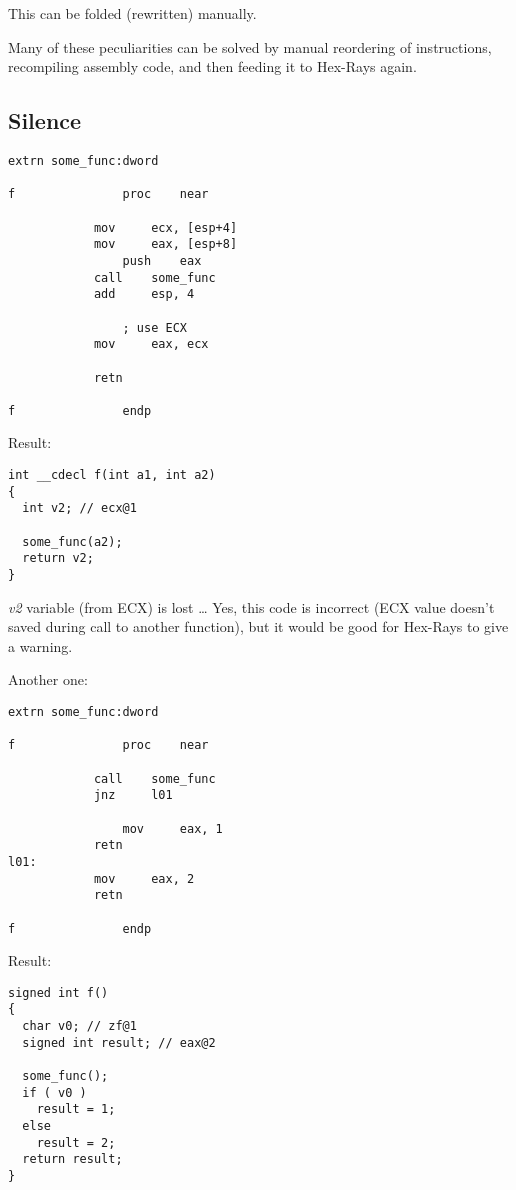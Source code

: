 This can be folded (rewritten) manually.

Many of these peculiarities can be solved by manual reordering of instructions, recompiling assembly code,
and then feeding it to Hex-Rays again.

\subsection{Silence}

\begin{lstlisting}[style=customasmx86]
extrn some_func:dword

f               proc    near

        	mov     ecx, [esp+4]
	        mov     eax, [esp+8]
                push    eax
        	call    some_func
	        add     esp, 4

                ; use ECX
        	mov     eax, ecx

	        retn

f               endp
\end{lstlisting}

Result:

\begin{lstlisting}[style=customc]
int __cdecl f(int a1, int a2)
{
  int v2; // ecx@1

  some_func(a2);
  return v2;
}
\end{lstlisting}

\emph{v2} variable (from ECX) is lost \dots
Yes, this code is incorrect (ECX value doesn't saved during call to another function),
but it would be good for Hex-Rays to give a warning.

Another one:

\begin{lstlisting}[style=customasmx86]
extrn some_func:dword

f               proc    near

	        call    some_func
        	jnz     l01

                mov     eax, 1
	        retn
l01:
	        mov     eax, 2
        	retn

f               endp
\end{lstlisting}

Result:

\begin{lstlisting}[style=customc]
signed int f()
{
  char v0; // zf@1
  signed int result; // eax@2

  some_func();
  if ( v0 )
    result = 1;
  else
    result = 2;
  return result;
}
\end{lstlisting}

